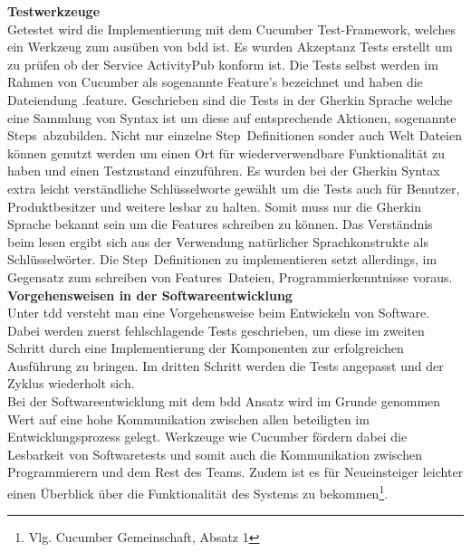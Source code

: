 \begingroup
	\fontsize{18pt}{12pt}\selectfont
	\textbf{Testwerkzeuge}
	\vspace{4pt}
\endgroup\\
Getestet wird die Implementierung mit dem Cucumber Test-Framework, welches ein Werkzeug zum ausüben von \gls{bdd} ist. Es wurden Akzeptanz Tests erstellt um zu prüfen ob der Service ActivityPub konform ist. Die Tests selbst werden im Rahmen von Cucumber als sogenannte \glqq Feature\grqq's bezeichnet und haben die Dateiendung \glqq .feature\grqq. Geschrieben sind die Tests in der Gherkin Sprache welche eine Sammlung von Syntax ist um diese auf entsprechende Aktionen, sogenannte \glqq Steps\grqq~abzubilden. Nicht nur einzelne \glqq Step\grqq~Definitionen sonder auch Welt Dateien können genutzt werden um einen Ort für wiederverwendbare Funktionalität zu haben und einen Testzustand einzuführen. Es wurden bei der Gherkin Syntax extra leicht verständliche Schlüsselworte gewählt um die Tests auch für Benutzer, Produktbesitzer und weitere lesbar zu halten. Somit muss nur die Gherkin Sprache bekannt sein um die Features schreiben zu können. Das Verständnis beim lesen ergibt sich aus der Verwendung natürlicher Sprachkonstrukte als Schlüsselwörter. Die \glqq Step\grqq~Definitionen zu implementieren setzt allerdings, im Gegensatz zum schreiben von \glqq Features\grqq~Dateien, Programmierkenntnisse voraus.\\

\begingroup
	\fontsize{18pt}{12pt}\selectfont
	\textbf{Vorgehensweisen in der Softwareentwicklung}
	\vspace{4pt}
\endgroup\\
Unter \gls{tdd} versteht man eine Vorgehensweise beim Entwickeln von Software. Dabei werden zuerst fehlschlagende Tests geschrieben, um diese im zweiten Schritt durch eine Implementierung der Komponenten zur erfolgreichen Ausführung zu bringen. Im dritten Schritt werden die Tests angepasst und der Zyklus wiederholt sich.\\

Bei der Softwareentwicklung mit dem \gls{bdd} Ansatz wird im Grunde genommen Wert auf eine hohe Kommunikation zwischen allen beteiligten im Entwicklungsprozess gelegt. Werkzeuge wie Cucumber fördern dabei die Lesbarkeit von Softwaretests und somit auch die Kommunikation zwischen Programmierern und dem Rest des Teams. Zudem ist es für Neueinsteiger leichter einen Überblick über die Funktionalität des Systems zu bekommen\footnote{Vlg. Cucumber Gemeinschaft, Absatz 1}.\\
 
